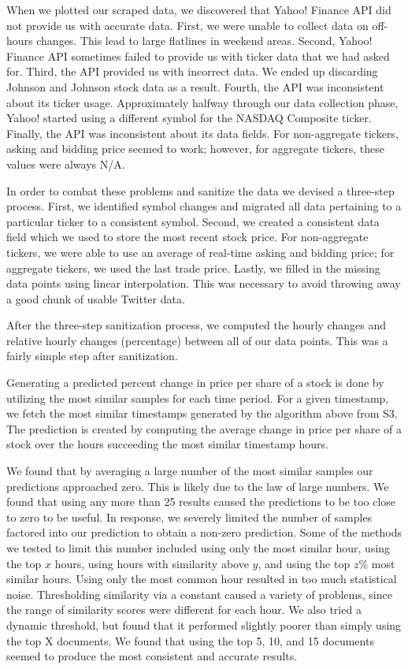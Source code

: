 \documentclass[twocolumn]{article}
\begin{document}
When we plotted our scraped data, we discovered that Yahoo! Finance API did not provide us with accurate data. First, we were unable to collect data on off-hours changes. This lead to large flatlines in weekend areas. Second, Yahoo! Finance API sometimes failed to provide us with ticker data that we had asked for. Third, the API provided us with incorrect data. We ended up discarding Johnson and Johnson stock data as a result. Fourth, the API was inconsistent about its ticker usage. Approximately halfway through our data collection phase, Yahoo! started using a different symbol for the NASDAQ Composite ticker. Finally, the API was inconsistent about its data fields. For non-aggregate tickers, asking and bidding price seemed to work; however, for aggregate tickers, these values were always N/A.

In order to combat these problems and sanitize the data we devised a three-step process. First, we identified symbol changes and migrated all data pertaining to a particular ticker to a consistent symbol. Second, we created a consistent data field which we used to store the most recent stock price. For non-aggregate tickers, we were able to use an average of real-time asking and bidding price; for aggregate tickers, we used the last trade price. Lastly, we filled in the missing data points using linear interpolation. This was necessary to avoid throwing away a good chunk of usable Twitter data.

After the three-step sanitization process, we computed the hourly changes and relative hourly changes (percentage) between all of our data points. This was a fairly simple step after sanitization.

Generating a predicted percent change in price per share of a stock is done by utilizing the most similar samples for each time period. For a given timestamp, we fetch the most similar timestamps generated by the algorithm above from S3. The prediction is created by computing the average change in price per share of a stock over the hours succeeding the most similar timestamp hours. 

We found that by averaging a large number of the most similar samples our predictions approached zero. This is likely due to the law of large numbers. We found that using any more than 25 results caused the predictions to be too close to zero to be useful. In response, we severely limited the number of samples factored into our prediction to obtain a non-zero prediction. Some of the methods we tested to limit this number included using only the most similar hour, using the top $x$ hours, using hours with similarity above $y$, and using the top $z$\% most similar hours. Using only the most common hour resulted in too much statistical noise. Thresholding similarity via a constant caused a variety of problems, since the range of similarity scores were different for each hour. We also tried a dynamic threshold, but found that it performed slightly poorer than simply using the top X documents. We found that using the top 5, 10, and 15 documents seemed to produce the most consistent and accurate results.
\end{document}
